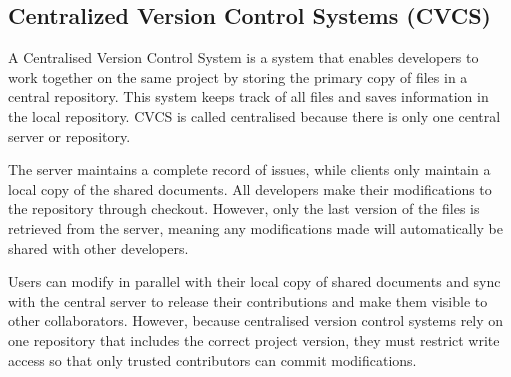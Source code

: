 
\subsection{Centralized Version Control Systems (CVCS)}
\label{sec:cvcs}
A Centralised Version Control System is a system that enables developers to work together on the same project by storing the primary copy of files in a central repository. This system keeps track of all files and saves information in the local repository. CVCS is called centralised because there is only one central server or repository.
\smallskip

The server maintains a complete record of issues, while clients only maintain a local copy of the shared documents. All developers make their modifications to the repository through checkout. However, only the last version of the files is retrieved from the server, meaning any modifications made will automatically be shared with other developers.
\smallskip

Users can modify in parallel with their local copy of shared documents and sync with the central server to release their contributions and make them visible to other collaborators. However, because centralised version control systems rely on one repository that includes the correct project version, they must restrict write access so that only trusted contributors can commit modifications.
\smallskip

